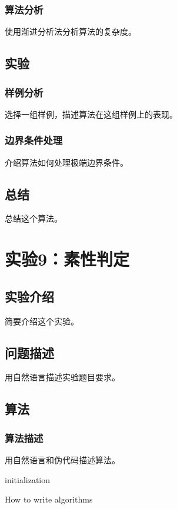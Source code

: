 \documentclass{ctexrep}
\begin{document}
\subsection{算法分析}
使用渐进分析法分析算法的复杂度。

\section{实验}
\subsection{样例分析}
选择一组样例，描述算法在这组样例上的表现。
\subsection{边界条件处理}
介绍算法如何处理极端边界条件。

\section{总结}
总结这个算法。

\chapter{实验9：素性判定}
\section{实验介绍}
简要介绍这个实验。

\section{问题描述}
用自然语言描述实验题目要求。

\section{算法}
\subsection{算法描述}
用自然语言和伪代码描述算法。
\begin{algorithm}
\SetAlgoLined
{}
 initialization\;
 \caption{How to write algorithms}
\end{algorithm}
\end{document}
